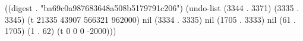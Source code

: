 
((digest . "ba69c0a987683648a508b5179791c206") (undo-list (3344 . 3371) (3335 . 3345) (t 21335 43907 566321 962000) nil (3334 . 3335) nil (1705 . 3333) nil (61 . 1705) (1 . 62) (t 0 0 0 -2000)))
